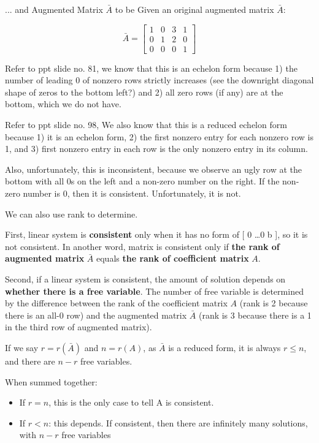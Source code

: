 \documentclass[11pt]{article}
\theoremstyle{definition}
\begin{document}
... and Augmented Matrix $\bar{A}$ to be
 Given an original augmented matrix $\bar{A}$:

\[
\bar{A}=
\left[
\begin{array}{ccc|c}
1 & 0 & 3 & 1\\
0 & 1 & 2 & 0\\
0 & 0 & 0 & 1
\end{array}
\right]
\]

Refer to ppt slide no. 81, we know that this is an echelon form because 1) the number of leading 0 of nonzero rows strictly increases (see the downright diagonal shape of zeros to the bottom left?) and 2) all zero rows (if any) are at the bottom, which we do not have.

Refer to ppt slide no. 98, We also know that this is a reduced echelon form because 1) it is an echelon form, 2) the first nonzero entry for each nonzero row is 1, and 3) first nonzero entry in each row is the only nonzero entry in its column.

Also, unfortunately, this is inconsistent, because we observe an ugly row at the bottom with all 0s on the left and a non-zero number on the right. If the non-zero number is 0, then it is consistent. Unfortunately, it is not.


We can also use rank to determine. 

First, linear system is \textbf{consistent} only when it has no form of [ 0 \dots 0 b ], so it is not consistent. In another word, matrix is consistent only if \textbf{the rank of augmented matrix} $\bar{A}$ equals \textbf{the rank of coefficient matrix} $A$.

Second, if a linear system is consistent, the amount of solution depends on \textbf{whether there is a free variable}. The number of free variable is determined by the difference between the rank of the coefficient matrix $A$ (rank is 2 because there is an all-0 row) and the augmented matrix $\bar{A}$ (rank is 3 because there is a 1 in the third row of augmented matrix).

If we say $r= r(\bar{A}) $ and $ n = r(A) $, as $\bar{A}$ is a reduced form, it is always $r \leq n$, and there are $n - r$ free variables.

When summed together:
\begin{itemize}
    \item If $r = n$, this is the only case to tell A is consistent.
    \item If $r < n$: this depends. If consistent, then there are infinitely many solutions, with $n-r$ free variables
\end{itemize}
\end{document}
